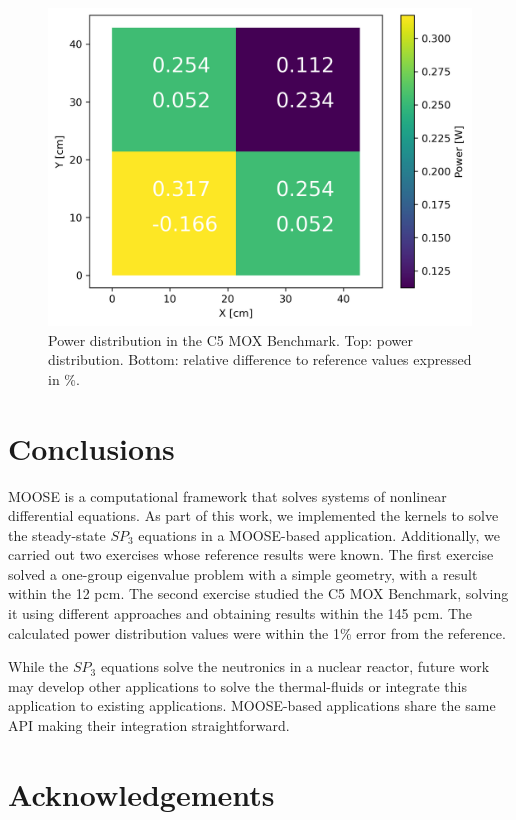 \documentclass{anstrans}
\begin{document}
\begin{figure}[htbp!] %
    \centering
    \includegraphics[width=0.95\linewidth]{figures/distrib.png}
    \hfill
    \caption{Power distribution in the C5 MOX Benchmark. Top: power distribution. Bottom: relative difference to reference values expressed in \%.}
    \label{fig:power-distrib}
\end{figure}


\section{Conclusions}

MOOSE is a computational framework that solves systems of nonlinear differential equations.
As part of this work, we implemented the kernels to solve the steady-state $SP_3$ equations in a MOOSE-based application.
Additionally, we carried out two exercises whose reference results were known.
The first exercise solved a one-group eigenvalue problem with a simple geometry, with a result within the 12 pcm.
The second exercise studied the C5 MOX Benchmark, solving it using different approaches and obtaining results within the 145 pcm.
The calculated power distribution values were within the 1\% error from the reference.

While the $SP_3$ equations solve the neutronics in a nuclear reactor, future work may develop other applications to solve the thermal-fluids or integrate this application to existing applications.
MOOSE-based applications share the same API making their integration straightforward.


\section{Acknowledgements}
\end{document}
